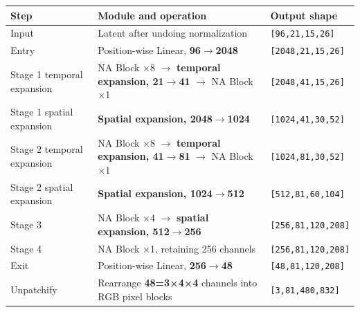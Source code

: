 \documentclass[
  11pt,
  a4paper,
]{article}
\newcounter{none} %
\begin{document}
{\def\LTcaptype{none} %
\begin{longtable}[]{@{}
  >{\raggedright\arraybackslash}p{}
  >{\raggedright\arraybackslash}p{}
  >{\raggedright\arraybackslash}p{}@{}}
\toprule\noalign{}
\begin{minipage}[b]{\linewidth}\raggedright
Step
\end{minipage} & \begin{minipage}[b]{\linewidth}\raggedright
Module and operation
\end{minipage} & \begin{minipage}[b]{\linewidth}\raggedright
Output shape
\end{minipage} \\
\midrule\noalign{}
\endhead
\bottomrule\noalign{}
\endlastfoot
Input & Latent after undoing normalization &
\texttt{{[}96,21,15,26{]}} \\
Entry & Position-wise Linear, \textbf{96\(\rightarrow\)2048} &
\texttt{{[}2048,21,15,26{]}} \\
Stage 1 temporal expansion & NA Block ×8 \(\rightarrow\)
\textbf{temporal expansion, 21\(\rightarrow\)41} \(\rightarrow\) NA
Block ×1 & \texttt{{[}2048,41,15,26{]}} \\
Stage 1 spatial expansion & \textbf{Spatial expansion,
2048\(\rightarrow\)1024} & \texttt{{[}1024,41,30,52{]}} \\
Stage 2 temporal expansion & NA Block ×8 \(\rightarrow\)
\textbf{temporal expansion, 41\(\rightarrow\)81} \(\rightarrow\) NA
Block ×1 & \texttt{{[}1024,81,30,52{]}} \\
Stage 2 spatial expansion & \textbf{Spatial expansion,
1024\(\rightarrow\)512} & \texttt{{[}512,81,60,104{]}} \\
Stage 3 & NA Block ×4 \(\rightarrow\) \textbf{spatial expansion,
512\(\rightarrow\)256} & \texttt{{[}256,81,120,208{]}} \\
Stage 4 & NA Block ×1, retaining 256 channels &
\texttt{{[}256,81,120,208{]}} \\
Exit & Position-wise Linear, \textbf{256\(\rightarrow\)48} &
\texttt{{[}48,81,120,208{]}} \\
Unpatchify & Rearrange \textbf{48=3×4×4} channels into RGB pixel blocks
& \texttt{{[}3,81,480,832{]}} \\
\end{longtable}
}

\endgroup
\end{document}
